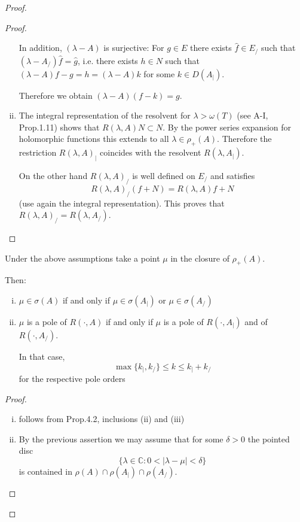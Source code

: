 \begin{proof}
\begin{proof}
\begin{enumerate}[(i)]
\newpage

In addition, $(\lambda-A)$ is surjective: For $g \in E$ there exists $\hat{f} \in E_{/}$ such that $(\lambda-A_{/})\hat{f} = \hat{g}$, i.e. there exists $h \in N$ such that $(\lambda-A)f - g = h = (\lambda-A)k$ for some $k \in D(A_{|})$.

Therefore we obtain $(\lambda-A)(f-k) = g$.

\item The integral representation of the resolvent for $\lambda > \omega(T)$ (see A-I, Prop.1.11) shows that $R(\lambda,A)N \subset N$.
By the power series expansion for holomorphic functions this extends to all $\lambda \in \rho_{+}(A)$.
Therefore the restriction $R(\lambda,A)_{|}$ coincides with the resolvent $R(\lambda,A_{|})$.

On the other hand $R(\lambda,A)_{/}$ is well defined on $E_{/}$ and satisfies
\[
R(\lambda,A)_{/}(f+N) = R(\lambda,A)f + N
\]
(use again the integral representation).
This proves that $R(\lambda,A)_{/} = R(\lambda,A_{/})$.
\end{enumerate}
\end{proof}

\begin{corollary}\label{cor:a3-4.3}

Under the above assumptions take a point $\mu$ in the closure of $\rho_{+}(A)$.

Then:
\begin{enumerate}[(i)]
\item $\mu \in \sigma(A)$ if and only if $\mu \in \sigma(A_{|})$ or $\mu \in \sigma(A_{/})$

\item $\mu$ is a pole of $R(\cdot,A)$ if and only if $\mu$ is a pole of $R(\cdot,A_{|})$ and of $R(\cdot,A_{/})$.

In that case,
\[
\max\{k_{|},k_{/}\} \leq k \leq k_{|} + k_{/}
\]
for the respective pole orders
\end{enumerate}
\end{corollary}

\begin{proof}
\begin{enumerate}[(i)]
\item follows from Prop.4.2, inclusions (ii) and (iii)

\item By the previous assertion we may assume that for some $\delta > 0$ the pointed disc
\[
\{\lambda \in \mathbb{C} \colon 0 < |\lambda-\mu| < \delta\}
\]
is contained in $\rho(A) \cap \rho(A_{|}) \cap \rho(A_{/})$.


\end{enumerate}
\end{proof}
\end{proof}
